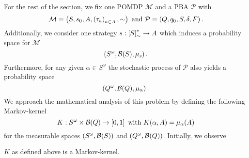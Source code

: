 For the rest of the section, we fix one \ac{POMDP} $\mathcal{M}$ and a \ac{PBA}
$\mathcal{P}$ with
\begin{equation*}
  \mathcal{M} = \left(S, s_{0}, A, \left(\tau_{a}\right)_{a\in A}, \sim\right)
\text{ and }
  \mathcal{P} = \left(Q, q_{0}, S, \delta, F\right).
\end{equation*}
Additionally, we consider one strategy $s:\left[S\right]_{\sim}^{*}\rightarrow A$
which induces a probability space for $\mathcal{M}$
\begin{equation*}
  \left(S^{\omega},\mathcal{B}(S), \mu_{s}\right).
\end{equation*}
Furthermore, for any given $\alpha\in S^{\omega}$ the stochastic process of
$\mathcal{P}$ also yields a probability space
\begin{equation*}
  \left(Q^{\omega},\mathcal{B}(Q), \mu_{\alpha}\right).
\end{equation*}
We approach the mathematical analysis of this problem by defining the following
Markov-kernel
\begin{equation*}
  K:S^{\omega}\times\mathcal{B}(Q)\rightarrow\left[0,1\right]\text{ with }
    K(\alpha, A) = \mu_{\alpha}(A)
\end{equation*}
for the measurable spaces $\left(S^{\omega},\mathcal{B}(S)\right)$ and
$\left(Q^{\omega},\mathcal{B}(Q)\right)$. Initially, we observe
\begin{lemma}
  $K$ as defined above is a Markov-kernel.
\end{lemma}
